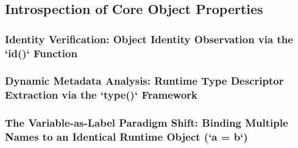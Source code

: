 \subsection{Introspection of Core Object Properties}
\subsubsection{Identity Verification: Object Identity Observation via the `id()` Function}
\subsubsection{Dynamic Metadata Analysis: Runtime Type Descriptor Extraction via the `type()` Framework}
\subsubsection{The Variable-as-Label Paradigm Shift: Binding Multiple Names to an Identical Runtime Object (`a = b`)}
